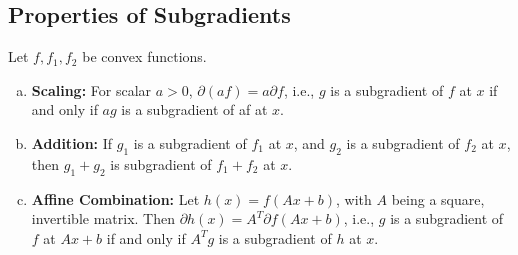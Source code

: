 \documentclass[11pt,a4paper]{article}
\begin{document}
\subsection{Properties of Subgradients}
Let $f,f_1,f_2$ be convex functions.
\begin{enumerate}[(a)]
    \item \textbf{Scaling:} For scalar $a > 0$, $\partial(af) = a\partial f$, i.e., $g$ is a subgradient of $f$ at $x$ if and only if $ag$ is a subgradient of af at $x$.
    \item \textbf{Addition:} If $g_1$ is a subgradient of $f_1$ at $x$, and $g_2$ is a subgradient of $f_2$ at $x$, then $g_1 + g_2$ is subgradient of $f_1 + f_2$ at $x$.
    \item \textbf{Affine Combination:} Let $h(x) = f(Ax+b)$, with $A$ being a square, invertible matrix. Then $\partial h(x) = A^T\partial f(Ax+b)$, i.e., $g$ is a subgradient of $f$ at $Ax + b$ if and only if $A^Tg$ is a subgradient of $h$ at $x$.
\end{enumerate}
\end{document}
